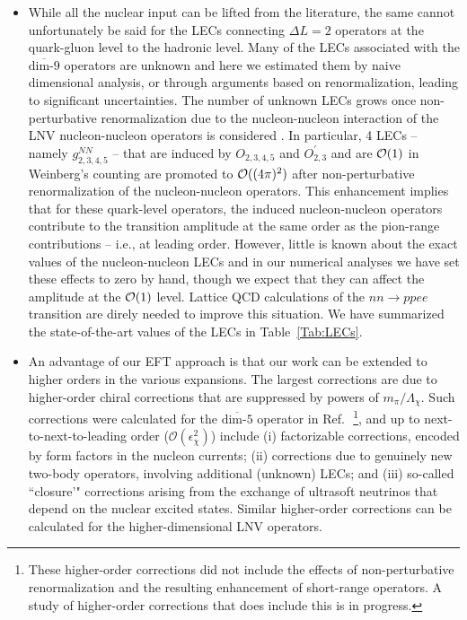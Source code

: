 \documentclass[letterpaper,11pt]{article}
\newcommand{\Or}{\mathcal O}
\newcommand{\textoverline}[1]{$\overline{\mbox{#1}}$}
\begin{document}
\begin{itemize}
 
 
 \item While all the nuclear input can be lifted from the literature, the same cannot unfortunately be said for the LECs connecting $\Delta L=2$ operators at the quark-gluon level to the hadronic level. Many of the LECs associated with the \textoverline{dim-9} operators are unknown and here we estimated them by naive dimensional analysis, or through arguments based on renormalization, leading to significant uncertainties. The number of unknown LECs grows once non-perturbative renormalization due to the nucleon-nucleon interaction of the LNV nucleon-nucleon operators is considered \cite{Cirigliano:2018hja}.
In particular, 4 LECs -- namely $g^{NN}_{2,3,4,5}$ -- that are induced by $O_{2,3,4,5}$ and $O^\prime_{2,3}$ and are
 ${\cal O}(1)$ in Weinberg's counting are promoted to ${\cal O}((4 \pi)^2)$ after non-perturbative renormalization of the nucleon-nucleon operators. This enhancement implies that for these  quark-level operators, the induced nucleon-nucleon operators contribute to the transition amplitude at the same order as the pion-range  contributions -- i.e., at leading order. However,  little is known about the exact values of the nucleon-nucleon LECs and in our numerical analyses we have set these effects to zero by hand, though we expect that they can affect the amplitude at the ${\cal O}(1)$ level. Lattice QCD calculations of the $nn\rightarrow pp ee$ transition are direly needed to improve this situation. We have summarized the state-of-the-art values of the LECs in Table~\ref{Tab:LECs}.
 
 \item An advantage of our EFT approach is that our work can be extended to higher orders in the various expansions. The largest corrections are due to higher-order chiral corrections that are suppressed by powers of $m_\pi/\Lambda_\chi$. Such corrections were calculated for the \textoverline{dim-5} operator in Ref.~\cite{Cirigliano:2017tvr}\,\footnote{These higher-order corrections did not include the effects of non-perturbative renormalization and the resulting enhancement of short-range operators. A study of higher-order corrections that does include this is in progress.},  and up to next-to-next-to-leading order ($\Or(\epsilon_\chi^2)$) include  (i)  factorizable corrections, encoded by  form factors in the nucleon currents; 
(ii) corrections due to genuinely  new two-body  operators,  involving
additional (unknown)  LECs;  and  (iii)  so-called   ``closure'" corrections arising from the exchange of ultrasoft neutrinos that depend on the nuclear excited states. Similar higher-order corrections can be calculated for the higher-dimensional LNV operators. 


\end{itemize}
\end{document}
